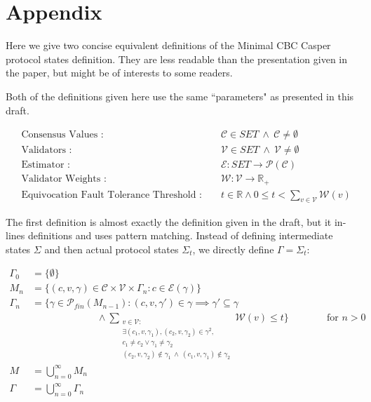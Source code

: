 \section{Appendix}

Here we give two concise equivalent definitions of the Minimal CBC Casper protocol states definition. They are less readable than the presentation given in the paper, but might be of interests to some readers.

Both of the definitions given here use the same ``parameters" as presented in this draft.

\begin{align}
&\text{Consensus Values :   } && \mathcal{C} \in SET ~ \land ~ \mathcal{C} \neq \emptyset \\ 
&\text{Validators :   } && \mathcal{V} \in SET ~ \land ~ \mathcal{V} \neq \emptyset\\
&\text{Estimator :   } &&\mathcal{E}: SET \to \mathcal{P}(\mathcal{C}) \\
&\text{Validator Weights :   } &&\mathcal{W}: \mathcal{V} \to \mathbb{R}_+ \\
&\text{Equivocation Fault Tolerance Threshold :   } && t \in \mathbb{R} \land 0 \leq t < \sum_{v \in \mathcal{V}} \mathcal{W}(v)
\end{align}

The first definition is almost exactly the definition given in the draft, but it in-lines definitions and uses pattern matching. Instead of defining intermediate states $\Sigma$ and then actual protocol states $\Sigma_t$, we directly define $\Gamma = \Sigma_t$:

\begin{align}
\Gamma_0 &= \{\emptyset\} \\
M_n &= \{ (c, v, \gamma) \in \mathcal{C} \times \mathcal{V} \times \Gamma_{n} : c \in \mathcal{E}(\gamma) \} \\
\Gamma_n &= \{ \gamma \in \mathcal{P}_{fin}(M_{n-1}) : (c, v, \gamma') \in \gamma \implies \gamma' \subseteq \gamma \\
&~~~~~~~~~~~~~~~~~~~~~~~~~~~~~~\land \sum_{ \substack{v \in \mathcal{V} :  \\ \exists (c_1 , v, \gamma_1), (c_2 , v, \gamma_2) \in \gamma^2, \\ c_1 \neq c_2 \lor \gamma_1 \neq \gamma_2 \\  (c_2 , v, \gamma_2) \notin \gamma_1 ~\land ~ (c_1 , v, \gamma_1) \notin \gamma_2}} \mathcal{W}(v) \leq t \}  ~~~~~~~~~~~~~~~~\text{ for $n > 0$}  \\
M &= \bigcup_{n = 0}^\infty M_n \\
\Gamma &= \bigcup_{n = 0}^\infty \Gamma_n  \\
\end{align}

